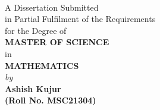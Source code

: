 \begin{titlepage}
\enlargethispage{3cm}

\begin{center}

\vspace*{-1cm}

\textbf{\Large \ttle}\\[10pt]

\vspace*{0.5cm}


A Dissertation Submitted \\
in Partial Fulfilment of the Requirements  \\
for the Degree of  \\
\vspace{5mm}
{\Large \bf MASTER OF SCIENCE } \\
in \\
{\large \bf MATHEMATICS } \\



                      \vspace{10mm}
                   {\em  by} \\ \vspace{3mm}
             {\large \bf Ashish Kujur} \\
{\large \bf (Roll No. MSC21304)}\\[.3in]


\end{center}
\end{titlepage}
